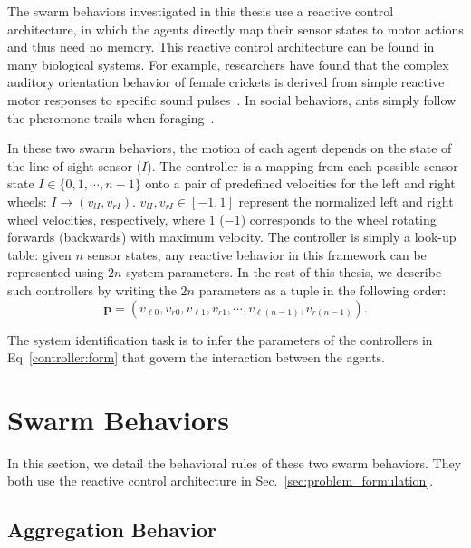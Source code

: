 The swarm behaviors investigated in this thesis use a reactive control architecture, in which the agents directly map their sensor states to motor actions and thus need no memory. This reactive control architecture can be found in many biological systems. For example, researchers have found that the complex auditory orientation behavior of female crickets is derived from simple reactive motor responses to specific sound pulses~\cite{Hedwig2004}. In social behaviors, ants simply follow the pheromone trails when foraging~\cite{Carroll1973}. 

In these two swarm behaviors, the motion of each agent depends on the state of the line-of-sight sensor ($I$). The controller is a mapping from each possible sensor state $I\in\{0,1,\cdots,n-1\}$ onto a pair of predefined velocities for the left and right wheels: $I  \rightarrow (v_{lI}, v_{rI})$. $v_{lI}, v_{rI} \in \left[-1,1\right]$ represent the normalized left and right wheel velocities, respectively, where $1$ ($-1$) corresponds to the wheel rotating forwards (backwards) with maximum velocity. The controller is simply a look-up table: given $n$ sensor states, any reactive behavior in this framework can be represented using $2n$ system parameters. In the rest of this thesis, we describe such controllers by writing the $2n$ parameters as a tuple in the following order:
\begin{equation}\label{controller:form}
\mathbf{p} = (v_{\ell 0}, v_{r0}, v_{\ell1}, v_{r1}, \cdots, v_{\ell (n-1)}, v_{r (n-1)}).
\end{equation}

The system identification task is to infer the parameters of the controllers in Eq~\eqref{controller:form} that govern the interaction between the agents. 
%
\section{Swarm Behaviors}\label{sec:swarm_behaviors}

In this section, we detail the behavioral rules of these two swarm behaviors. They both use the reactive control architecture in Sec.~\ref{sec:problem_formulation}.

\subsection{Aggregation Behavior}\label{sec:aggregation_behavior}

